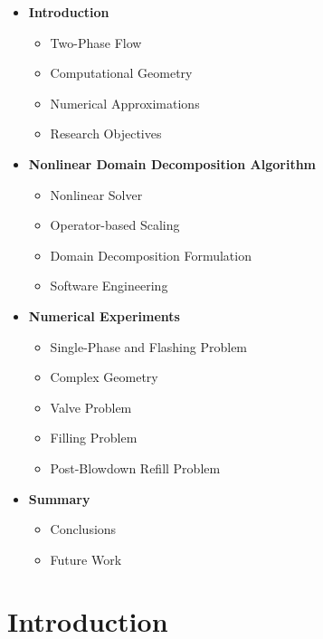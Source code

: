\documentclass[compress,xcolor=table]{beamer}
\begin{document}
\begin{frame}

\begin{itemize}
\item{\textbf{Introduction}
\begin{itemize}
\item{Two-Phase Flow}
\item{Computational Geometry}
\item{Numerical Approximations}
\item{Research Objectives}
\end{itemize}
}
\item{\textbf{Nonlinear Domain Decomposition Algorithm}
\begin{itemize}
\item{Nonlinear Solver}
\item{Operator-based Scaling}
\item{Domain Decomposition Formulation}
\item{Software Engineering}
\end{itemize}
}
\item{\textbf{Numerical Experiments}
\begin{itemize}
\item{Single-Phase and Flashing Problem}
\item{Complex Geometry}
\item{Valve Problem}
\item{Filling Problem}
\item{Post-Blowdown Refill Problem}
\end{itemize}
}
\item{\textbf{Summary}
\begin{itemize}
\item{Conclusions}
\item{Future Work}
\end{itemize}
}
\end{itemize}

\end{frame}
\section[Introduction]{Introduction}
\end{document}
